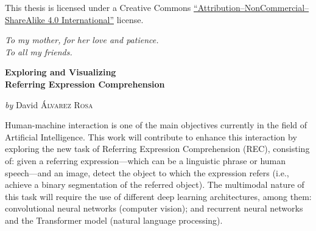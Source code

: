 \bigskip\noindent
\begin{minipage}{.66\textwidth}
  This thesis is licensed under a Creative Commons
  \href{https://creativecommons.org/licenses/by-nc-sa/4.0/deed.en}{``At\-tri\-bu\-tion--NonCommercial--ShareAlike
    4.0 International''} license.%
\end{minipage}\hfill
\begin{minipage}{.265\textwidth}
  \doclicenseImage[imagewidth=\textwidth]%
\end{minipage}
\normalsize



\clearpage{}
\thispagestyle{empty}
\begin{flushright}
  \itshape{}
  To my mother, for her love and patience. \\
  To all my friends.
\end{flushright}



\cleardoublepage{}
\thispagestyle{plain}
\null\vfill

\begin{center}
  \Large
  \textbf{Exploring and Visualizing\\
    Referring Expression Comprehension}

  \vspace{2ex}
  \large
  \textit{by} David \textsc{Álvarez Rosa}

  \vspace{3ex}
  \textbf{\abstractname}
\end{center}

\vspace{-2ex}
\noindent Human-machine interaction is one of the main objectives currently in
the field of Artificial Intelligence. This work will contribute to enhance this
interaction by exploring the new task of Referring Expression Comprehension
(REC), consisting of: given a referring expression---which can be a linguistic
phrase or human speech---and an image, detect the object to which the
expression refers (i.e., achieve a binary segmentation of the referred
object). The multimodal nature of this task will require the use of different
deep learning architectures, among them: convolutional neural networks
(computer vision); and recurrent neural networks and the Transformer model
(natural language processing).

